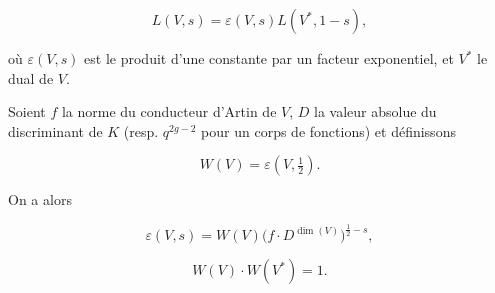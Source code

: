 \documentclass[9pt,twoside]{extarticle}
\begin{document}
{\[
\tag{1.1.1} L(V,s)=\varepsilon(V,s)L(V^*,1-s),
\]

où \(\varepsilon(V,s)\) est le produit d’une constante par un facteur exponentiel, et \(V^*\) le dual de \(V\).\par

Soient \(f\) la norme du conducteur d’Artin de \(V\), \(D\) la valeur absolue du discriminant de \(K\) (resp. \(q^{2g-2}\) pour un corps de fonctions) et définissons\par

\[
\tag{1.1.2} W(V)=\varepsilon\!\left(V,\tfrac12\right).
\]

On a alors\par

\[
\tag{1.1.3} \varepsilon(V,s)=W(V)\bigl(f\cdot D^{\dim(V)}\bigr)^{\frac12-s},
\]

\[
\tag{1.1.4} W(V)\cdot W(V^*)=1.
\]
}
\end{document}
